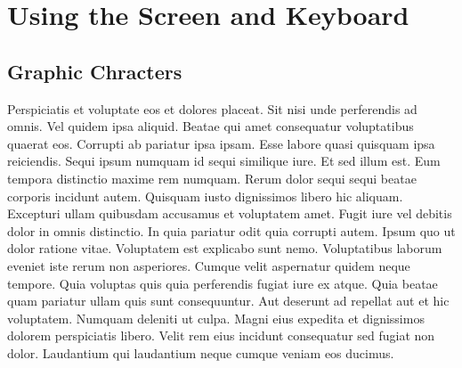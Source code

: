 
\makeatletter\@openrightfalse
\part{Using the Screen and Keyboard}



\chapter{Graphic Chracters}

Perspiciatis et voluptate eos et dolores placeat. Sit nisi unde perferendis ad
omnis. Vel quidem ipsa aliquid. Beatae qui amet consequatur voluptatibus
quaerat eos. Corrupti ab pariatur ipsa ipsam. Esse labore quasi quisquam ipsa
reiciendis. Sequi ipsum numquam id sequi similique iure. Et sed illum est. Eum
tempora distinctio maxime rem numquam. Rerum dolor sequi sequi beatae corporis
incidunt autem. Quisquam iusto dignissimos libero hic aliquam. Excepturi ullam
quibusdam accusamus et voluptatem amet. Fugit iure vel debitis dolor in omnis
distinctio. In quia pariatur odit quia corrupti autem. Ipsum quo ut dolor
ratione vitae. Voluptatem est explicabo sunt nemo. Voluptatibus laborum eveniet
iste rerum non asperiores. Cumque velit aspernatur quidem neque tempore. Quia
voluptas quis quia perferendis fugiat iure ex atque. Quia beatae quam pariatur
ullam quis sunt consequuntur. Aut deserunt ad repellat aut et hic voluptatem.
Numquam deleniti ut culpa. Magni eius expedita et dignissimos dolorem
perspiciatis libero. Velit rem eius incidunt consequatur sed fugiat non dolor.
Laudantium qui laudantium neque cumque veniam eos ducimus.

